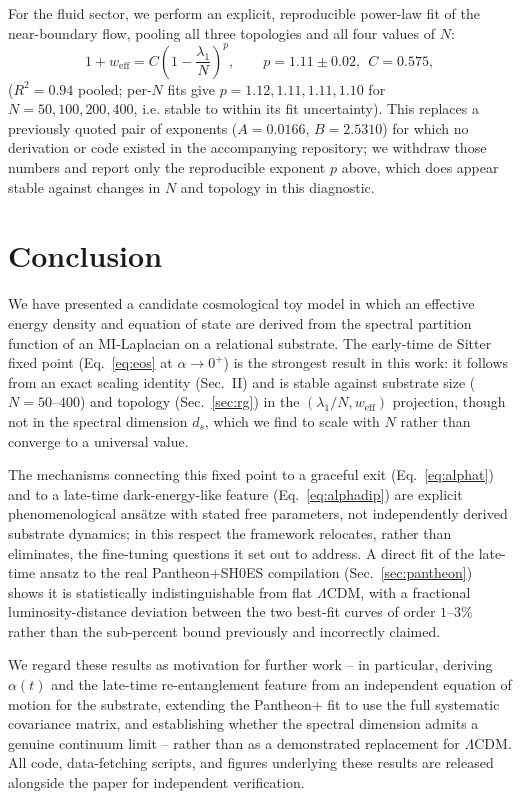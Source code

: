 \documentclass[onecolumn,PRD,amsmath,amssymb,aps,nofootinbib,superscriptaddress,11pt]{revtex4-2}
\begin{document}
For the fluid sector, we perform an explicit, reproducible power-law fit of the near-boundary flow, pooling all three topologies and all four values of $N$:
\begin{equation}
1+w_{\text{eff}} = C\left(1-\frac{\lambda_1}{N}\right)^{p}, \qquad p = 1.11 \pm 0.02,\ \ C = 0.575,
\label{eq:criticalexp}
\end{equation}
($R^2=0.94$ pooled; per-$N$ fits give $p=1.12, 1.11, 1.11, 1.10$ for $N=50,100,200,400$, i.e. stable to within its fit uncertainty). This replaces a previously quoted pair of exponents ($A=0.0166$, $B=2.5310$) for which no derivation or code existed in the accompanying repository; we withdraw those numbers and report only the reproducible exponent $p$ above, which does appear stable against changes in $N$ and topology in this diagnostic.

\section{Conclusion}
We have presented a candidate cosmological toy model in which an effective energy density and equation of state are derived from the spectral partition function of an MI-Laplacian on a relational substrate. The early-time de Sitter fixed point (Eq.~\eqref{eq:eos} at $\alpha\to0^+$) is the strongest result in this work: it follows from an exact scaling identity (Sec.~II) and is stable against substrate size ($N=50$--$400$) and topology (Sec.~\ref{sec:rg}) in the $(\lambda_1/N, w_{\text{eff}})$ projection, though not in the spectral dimension $d_s$, which we find to scale with $N$ rather than converge to a universal value.

The mechanisms connecting this fixed point to a graceful exit (Eq.~\eqref{eq:alphat}) and to a late-time dark-energy-like feature (Eq.~\eqref{eq:alphadip}) are explicit phenomenological ans\"atze with stated free parameters, not independently derived substrate dynamics; in this respect the framework relocates, rather than eliminates, the fine-tuning questions it set out to address. A direct fit of the late-time ansatz to the real Pantheon+SH0ES compilation (Sec.~\ref{sec:pantheon}) shows it is statistically indistinguishable from flat $\Lambda$CDM, with a fractional luminosity-distance deviation between the two best-fit curves of order $1$--$3\%$ rather than the sub-percent bound previously and incorrectly claimed.

We regard these results as motivation for further work -- in particular, deriving $\alpha(t)$ and the late-time re-entanglement feature from an independent equation of motion for the substrate, extending the Pantheon+ fit to use the full systematic covariance matrix, and establishing whether the spectral dimension admits a genuine continuum limit -- rather than as a demonstrated replacement for $\Lambda$CDM. All code, data-fetching scripts, and figures underlying these results are released alongside the paper for independent verification.
\end{document}
